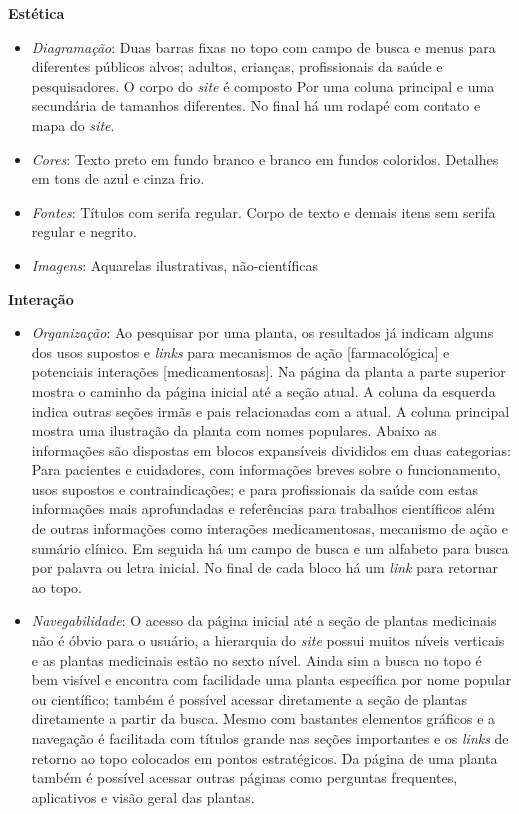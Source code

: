 \textbf{Estética}

\begin{itemize}
\item
  \emph{Diagramação}: Duas barras fixas no topo com campo de busca e menus para diferentes públicos alvos; adultos, crianças, profissionais da saúde e pesquisadores. O corpo do \emph{site} é composto Por uma coluna principal e uma secundária de tamanhos diferentes. No final há um rodapé com contato e mapa do \emph{site}.
\item
  \emph{Cores}: Texto preto em fundo branco e branco em fundos coloridos. Detalhes em tons de azul e cinza frio.
\item
  \emph{Fontes}: Títulos com serifa regular. Corpo de texto e demais itens sem serifa regular e negrito.
\item
  \emph{Imagens}: Aquarelas ilustrativas, não-científicas
\end{itemize}

\textbf{Interação}

\begin{itemize}
\item
  \emph{Organização}: Ao pesquisar por uma planta, os resultados já indicam alguns dos usos supostos e \emph{links} para mecanismos de ação {[}farmacológica{]} e potenciais interações {[}medicamentosas{]}. Na página da planta a parte superior mostra o caminho da página inicial até a seção atual. A coluna da esquerda indica outras seções irmãs e pais relacionadas com a atual. A coluna principal mostra uma ilustração da planta com nomes populares. Abaixo as informações são dispostas em blocos expansíveis divididos em duas categorias: Para pacientes e cuidadores, com informações breves sobre o funcionamento, usos supostos e contraindicações; e para profissionais da saúde com estas informações mais aprofundadas e referências para trabalhos científicos além de outras informações como interações medicamentosas, mecanismo de ação e sumário clínico. Em seguida há um campo de busca e um alfabeto para busca por palavra ou letra inicial. No final de cada bloco há um \emph{link} para retornar ao topo.
\item
  \emph{Navegabilidade}: O acesso da página inicial até a seção de plantas medicinais não é óbvio para o usuário, a hierarquia do \emph{site} possui muitos níveis verticais e as plantas medicinais estão no sexto nível. Ainda sim a busca no topo é bem visível e encontra com facilidade uma planta específica por nome popular ou científico; também é possível acessar diretamente a seção de plantas diretamente a partir da busca. Mesmo com bastantes elementos gráficos e a navegação é facilitada com títulos grande nas seções importantes e os \emph{links} de retorno ao topo colocados em pontos estratégicos. Da página de uma planta também é possível acessar outras páginas como perguntas frequentes, aplicativos e visão geral das plantas.
\end{itemize}

